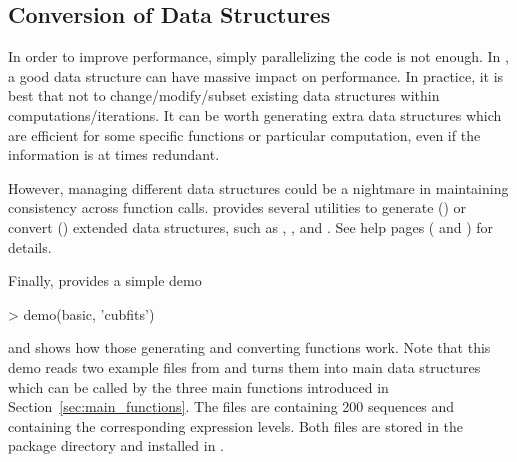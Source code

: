 \subsection[Conversion of Data Structures]{Conversion of Data Structures}
\label{sec:conversion_of_data_strcutures}

In order to improve performance, simply parallelizing the code is not enough.
In , a good data structure can have massive impact on performance.
In practice, it is best that not to change/modify/subset existing
data structures within computations/iterations.
It can be worth generating extra data structures which are efficient
for some specific functions or particular computation, even if the information
is at times redundant.

However, managing different data structures could be a nightmare in maintaining
consistency across function calls.
 provides several utilities to generate ()
or convert () extended data structures, such as
, , and .
See help pages ( and
) for details.

Finally,  provides a simple demo
\begin{Code}
> demo(basic, 'cubfits')
\end{Code}
and shows how those generating and converting functions work.
Note that this demo reads two example files from  and turns them
into main data structures which can be called by the three main functions 
introduced in Section~\ref{sec:main_functions}.
The files are  containing 200 sequences and
 containing the corresponding expression levels.
Both files are stored in the package directory 
and installed in .

